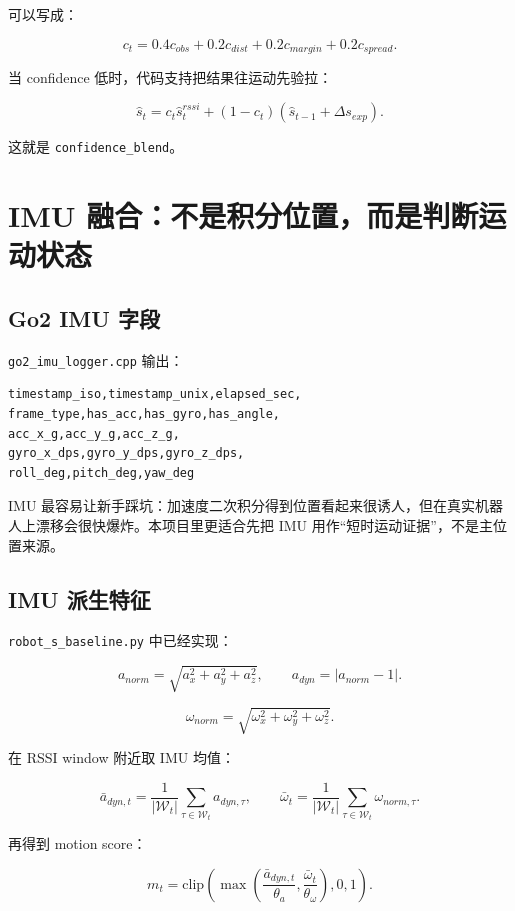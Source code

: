 \documentclass[11pt,a4paper,openany]{report}
\newcommand{\file}[1]{\nolinkurl{#1}}
\newcommand{\param}[1]{\nolinkurl{#1}}
\begin{document}
可以写成：

\[
  c_t =
  0.4 c_{obs}
  +0.2 c_{dist}
  +0.2 c_{margin}
  +0.2 c_{spread}.
\]

当 confidence 低时，代码支持把结果往运动先验拉：

\[
  \hat{s}_t
  =
  c_t\hat{s}_t^{rssi}
  +(1-c_t)(\hat{s}_{t-1}+\Delta s_{exp}).
\]

这就是 \param{confidence_blend}。

\chapter{IMU 融合：不是积分位置，而是判断运动状态}
\label{chap:imu}

\section{Go2 IMU 字段}

\file{go2_imu_logger.cpp} 输出：

\begin{lstlisting}
timestamp_iso,timestamp_unix,elapsed_sec,
frame_type,has_acc,has_gyro,has_angle,
acc_x_g,acc_y_g,acc_z_g,
gyro_x_dps,gyro_y_dps,gyro_z_dps,
roll_deg,pitch_deg,yaw_deg
\end{lstlisting}

IMU 最容易让新手踩坑：加速度二次积分得到位置看起来很诱人，但在真实机器人上漂移会很快爆炸。本项目里更适合先把 IMU 用作“短时运动证据”，不是主位置来源。

\section{IMU 派生特征}

\file{robot_s_baseline.py} 中已经实现：

\[
  a_{norm} = \sqrt{a_x^2+a_y^2+a_z^2},
  \qquad
  a_{dyn} = |a_{norm}-1|.
\]

\[
  \omega_{norm}
  =
  \sqrt{\omega_x^2+\omega_y^2+\omega_z^2}.
\]

在 RSSI window 附近取 IMU 均值：

\[
  \bar{a}_{dyn,t}
  =
  \frac{1}{|\mathcal{W}_t|}
  \sum_{\tau \in \mathcal{W}_t} a_{dyn,\tau},
  \qquad
  \bar{\omega}_{t}
  =
  \frac{1}{|\mathcal{W}_t|}
  \sum_{\tau \in \mathcal{W}_t} \omega_{norm,\tau}.
\]

再得到 motion score：

\[
  m_t =
  \text{clip}
  \left(
    \max
    \left(
      \frac{\bar{a}_{dyn,t}}{\theta_a},
      \frac{\bar{\omega}_{t}}{\theta_\omega}
    \right),
    0,1
  \right).
\]
\end{document}
